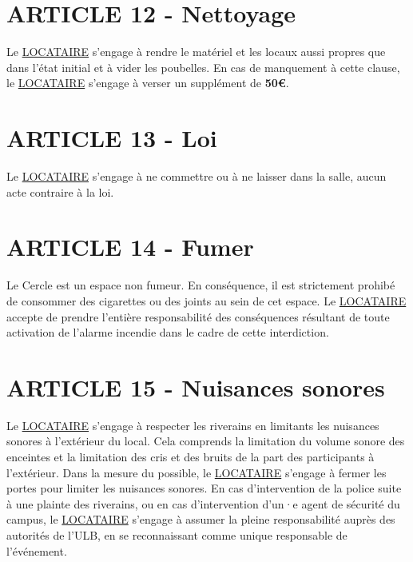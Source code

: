 \documentclass{article}
\begin{document}
\section*{ARTICLE 12 - Nettoyage}
Le \underline{LOCATAIRE} s’engage à rendre le matériel et les locaux aussi propres que dans l’état initial et à vider les poubelles. En cas de manquement à cette clause, le \underline{LOCATAIRE} s’engage à verser un supplément de \textbf{50€}.

\section*{ARTICLE 13 - Loi}
Le \underline{LOCATAIRE} s’engage à ne commettre ou à ne laisser dans la salle, aucun acte contraire à la loi.

\section*{ARTICLE 14 - Fumer}
Le Cercle est un espace non fumeur.  En conséquence, il est strictement prohibé de consommer des cigarettes ou des joints au sein de cet espace. Le \underline{LOCATAIRE} accepte de prendre l'entière responsabilité des conséquences résultant de toute activation de l'alarme incendie dans le cadre de cette interdiction.

\section{ARTICLE 15 - Nuisances sonores}
Le \underline{LOCATAIRE} s'engage à respecter les riverains en limitants les nuisances sonores à l'extérieur du local. Cela comprends la limitation du volume sonore des enceintes et la limitation des cris et des bruits de la part des participants à l'extérieur. Dans la mesure du possible, le \underline{LOCATAIRE} s'engage à fermer les portes pour limiter les nuisances sonores. En cas d'intervention de la police suite à une plainte des riverains, ou en cas d'intervention d'un·e agent de sécurité du campus, le \underline{LOCATAIRE} s'engage à assumer la pleine responsabilité auprès des autorités de l'ULB, en se reconnaissant comme unique responsable de l'événement.
\end{document}
